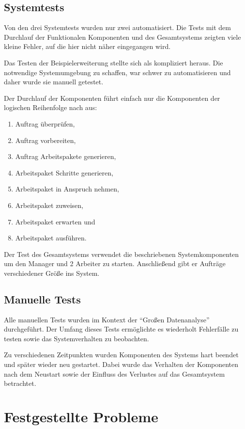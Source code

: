 \subsection{Systemtests}

Von den drei Systemtests wurden nur zwei automatisiert.
Die Tests mit dem Durchlauf der Funktionalen Komponenten und des Gesamtsystems
zeigten viele kleine Fehler, auf die hier nicht näher eingegangen wird.

Das Testen der Beispielerweiterung stellte sich als kompliziert heraus.
Die notwendige Systemumgebung zu schaffen, war schwer zu automatisieren und daher wurde sie manuell getestet.

Der Durchlauf der Komponenten führt einfach nur die Komponenten der logischen Reihenfolge nach aus:
\begin{enumerate}
    \item Auftrag überprüfen,
    \item Auftrag vorbereiten,
    \item Auftrag Arbeitspakete generieren,
    \item Arbeitspaket Schritte generieren,
    \item Arbeitspaket in Anspruch nehmen,
    \item Arbeitspaket zuweisen,
    \item Arbeitspaket erwarten und
    \item Arbeitspaket ausführen.
\end{enumerate}

Der Test des Gesamtsystems verwendet die beschriebenen Systemkomponenten um den Manager und 2 Arbeiter zu starten.
Anschließend gibt er Aufträge verschiedener Größe ins System.

\subsection{Manuelle Tests}

Alle manuellen Tests wurden im Kontext der ``Großen Datenanalyse'' durchgeführt.
Der Umfang dieses Tests ermöglichte es wiederholt Fehlerfälle zu testen sowie das Systemverhalten zu beobachten.

Zu verschiedenen Zeitpunkten wurden Komponenten des Systems hart beendet und später wieder neu gestartet.
Dabei wurde das Verhalten der Komponenten nach dem Neustart
 sowie der Einfluss des Verlustes auf das Gesamtsystem betrachtet.


\section{Festgestellte Probleme}
\label{sec:eval:probleme}

